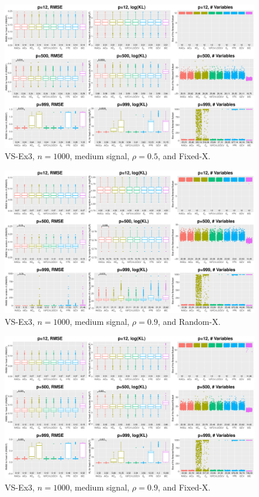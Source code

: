 \begin{figure}[!ht]
\centering
\includegraphics[width=\textwidth]{figures/supplement/fixedx_VS-Ex3_n1000_msnr_rho05.eps}
\caption{VS-Ex3, $n=1000$, medium signal, $\rho=0.5$, and Fixed-X.}
\end{figure}
\clearpage
\begin{figure}[!ht]
\centering
\includegraphics[width=\textwidth]{figures/supplement/randomx_VS-Ex3_n1000_msnr_rho09.eps}
\caption{VS-Ex3, $n=1000$, medium signal, $\rho=0.9$, and Random-X.}
\end{figure}
\begin{figure}[!ht]
\centering
\includegraphics[width=\textwidth]{figures/supplement/fixedx_VS-Ex3_n1000_msnr_rho09.eps}
\caption{VS-Ex3, $n=1000$, medium signal, $\rho=0.9$, and Fixed-X.}
\end{figure}
